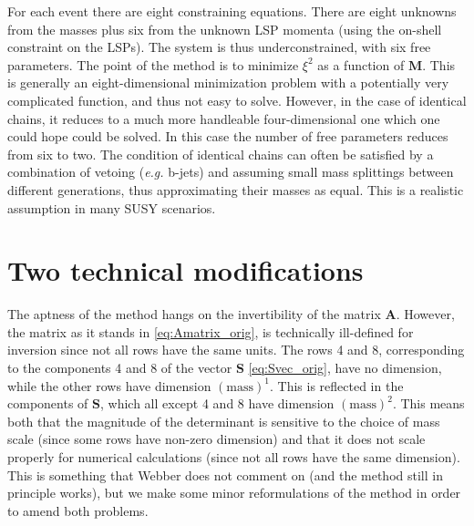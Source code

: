 \documentclass[twoside,english]{uiofysmaster}
\begin{document}
For each event there are eight constraining equations. There are eight unknowns from the masses plus six from the unknown LSP momenta (using the on-shell constraint on the LSPs). The system is thus underconstrained, with six free parameters. The point of the method is to minimize $\xi^2$ as a function of $\mathbf{M}$. This is generally an eight-dimensional minimization problem with a potentially very complicated function, and thus not easy to solve. However, in the case of identical chains, it reduces to a much more handleable four-dimensional one which one could hope could be solved. In this case the number of free parameters reduces from six to two. The condition of identical chains can often be satisfied by a combination of vetoing ({\it e.g.} b-jets) and assuming small mass splittings between different generations, thus approximating their masses as equal. This is a realistic assumption in many SUSY scenarios.

\section{Two technical modifications}\label{sec:dimension_fixing}
The aptness of the method hangs on the invertibility of the matrix $\mathbf{A}$. However, the matrix as it stands in \eqref{eq:Amatrix_orig}, is technically ill-defined for inversion since not all rows have the same units. The rows 4 and 8, corresponding to the components 4 and 8 of the vector $\mathbf{S}$ \eqref{eq:Svec_orig}, have no dimension, while the other rows have dimension $(\mathrm{mass})^1$. This is reflected in the components of $\mathbf{S}$, which all except 4 and 8 have dimension $(\mathrm{mass})^2$. This means both that the magnitude of the determinant is sensitive to the choice of mass scale (since some rows have non-zero dimension) and that it does not scale properly for numerical calculations (since not all rows have the same dimension). This is something that Webber does not comment on (and the method still in principle works), but we make some minor reformulations of the method in order to amend both problems.
\end{document}
